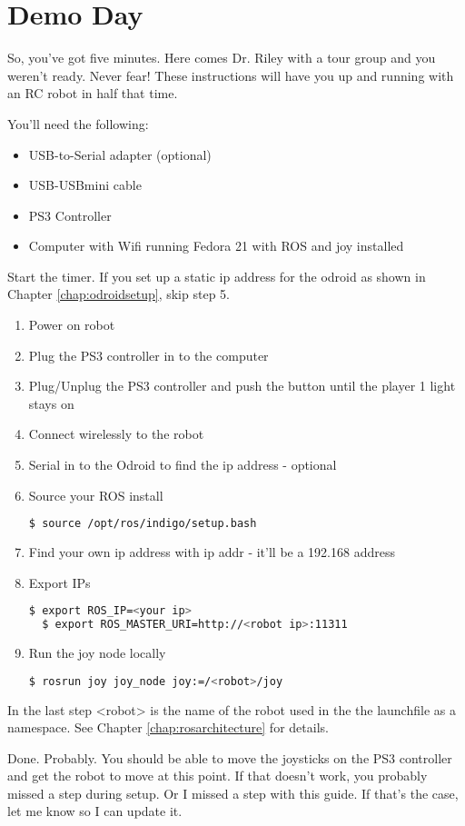 
\chapter{Demo Day}
\label{chap:demoday}

So, you've got five minutes. Here comes Dr. Riley with a tour group and you weren't ready. Never fear! These instructions will have you up and running with an RC robot in half that time.

You'll need the following:

\begin{itemize}
\item{USB-to-Serial adapter (optional)}
\item{USB-USBmini cable}
\item{PS3 Controller}
\item{Computer with Wifi running Fedora 21 with ROS and joy installed}
\end{itemize}

Start the timer. If you set up a static ip address for the odroid as shown in Chapter \ref{chap:odroidsetup}, skip step 5.
\begin{enumerate}
\item{Power on robot}
\item{Plug the PS3 controller in to the computer}
\item{Plug/Unplug the PS3 controller and push the button until the player 1 light stays on}
\item{Connect wirelessly to the robot}
\item{Serial in to the Odroid to find the ip address - optional}
\item{Source your ROS install}
\begin{lstlisting}[language=bash]
  $ source /opt/ros/indigo/setup.bash
\end{lstlisting}
\item{Find your own ip address with ip addr - it'll be a 192.168 address}
\item{Export IPs}
\begin{lstlisting}[language=bash]
  $ export ROS_IP=<your ip>
  $ export ROS_MASTER_URI=http://<robot ip>:11311
\end{lstlisting}
\item{Run the joy node locally}
\begin{lstlisting}[language=bash]
  $ rosrun joy joy_node joy:=/<robot>/joy
\end{lstlisting}
\end{enumerate}

In the last step <robot> is the name of the robot used in the the launchfile as a namespace. See Chapter \ref{chap:rosarchitecture} for details.

Done. Probably. You should be able to move the joysticks on the PS3 controller and get the robot to move at this point. If that doesn't work, you probably missed a step during setup. Or I missed a step with this guide. If that's the case, let me know so I can update it.